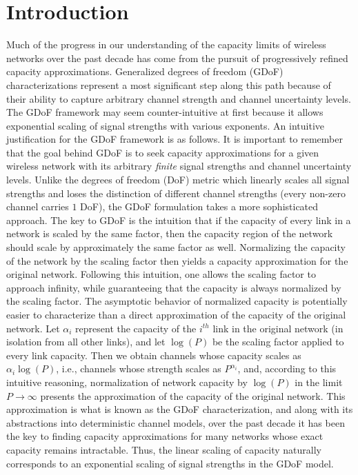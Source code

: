 \documentclass[11pt]{article}
\begin{document}
\section{Introduction}
Much of the progress in our understanding of the capacity limits of wireless networks over the past decade has come from the pursuit of progressively refined capacity approximations. Generalized degrees of freedom  (GDoF) characterizations represent a most significant step along this path because of their ability to capture arbitrary channel strength and channel uncertainty levels.  The GDoF framework may seem counter-intuitive at first because it allows exponential scaling of signal strengths with various exponents. An intuitive justification for the GDoF framework is as follows. It is important to remember that the goal behind GDoF is to seek capacity approximations for a given wireless network with its arbitrary \emph{finite} signal strengths and channel uncertainty levels. Unlike the degrees of freedom (DoF) metric which linearly scales all signal strengths and loses the distinction of different channel strengths (every non-zero channel carries $1$ DoF), the GDoF formulation takes a more sophisticated approach.  The key to GDoF is the intuition that if the capacity of every link in a network is scaled by the same factor, then the capacity region of the network should scale by approximately the same factor as well. Normalizing the capacity of the network by the scaling factor then yields a capacity approximation for the original network. Following this intuition, one allows the scaling factor to approach infinity, while guaranteeing that the capacity is always normalized by the scaling factor. The asymptotic behavior of normalized capacity is potentially easier to characterize than a direct approximation of the capacity of the original network. Let $\alpha_i$ represent the capacity of the $i^{th}$ link in the original network (in isolation from all other links), and let $\log(P)$ be the scaling factor applied to every link capacity. Then we obtain channels whose capacity scales as $\alpha_i\log(P)$, i.e., channels whose strength scales as $P^{\alpha_i}$, and, according to this intuitive reasoning, normalization of network capacity by $\log(P)$ in the limit $P\rightarrow\infty$ presents the approximation of the capacity of the original network. This approximation is what is known as the GDoF characterization, and along with its abstractions into deterministic channel models, over the past decade it has been the key to finding capacity approximations for many networks whose exact capacity remains intractable. Thus, the linear scaling of capacity naturally corresponds to an exponential scaling of signal strengths in the GDoF model.
\end{document}
